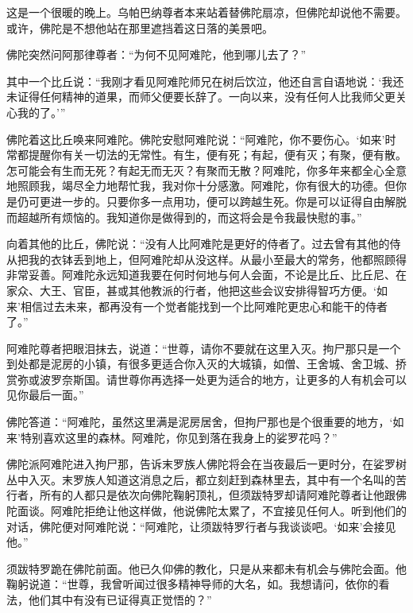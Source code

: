 \documentclass[12pt,twoside,openany]{book}
\begin{document}
这是一个很暖的晚上。乌帕巴纳尊者本来站着替佛陀扇凉，但佛陀却说他不需要。或许，佛陀是不想他站在那里遮挡着这日落的美景吧。

佛陀突然问阿那律尊者：“为何不见阿难陀，他到哪儿去了？”

其中一个比丘说：“我刚才看见阿难陀师兄在树后饮泣，他还自言自语地说：‘我还未证得任何精神的道果，而师父便要长辞了。一向以来，没有任何人比我师父更关心我的了。’”

佛陀着这比丘唤来阿难陀。佛陀安慰阿难陀说：“阿难陀，你不要伤心。‘如来’时常都提醒你有关一切法的无常性。有生，便有死；有起，便有灭；有聚，便有散。怎可能会有生而无死？有起无而无灭？有聚而无散？阿难陀，你多年来都全心全意地照顾我，竭尽全力地帮忙我，我对你十分感激。阿难陀，你有很大的功德。但你是仍可更进一步的。只要你多一点用功，便可以跨越生死。你是可以证得自由解脱而超越所有烦恼的。我知道你是做得到的，而这将会是令我最快慰的事。”

向着其他的比丘，佛陀说：“没有人比阿难陀是更好的侍者了。过去曾有其他的侍从把我的衣钵丢到地上，但阿难陀却从没这样。从最小至最大的常务，他都照顾得非常妥善。阿难陀永远知道我要在何时何地与何人会面，不论是比丘、比丘尼、在家众、大王、官臣，甚或其他教派的行者，他把这些会议安排得智巧方便。‘如来’相信过去未来，都再没有一个觉者能找到一个比阿难陀更忠心和能干的侍者了。”

阿难陀尊者把眼泪抹去，说道：“世尊，请你不要就在这里入灭。拘尸那只是一个到处都是泥房的小镇，有很多更适合你入灭的大城镇，如僧、王舍城、舍卫城、挢赏弥或波罗奈斯国。请世尊你再选择一处更为适合的地方，让更多的人有机会可以见你最后一面。”

佛陀答道：“阿难陀，虽然这里满是泥房居舍，但拘尸那也是个很重要的地方，‘如来’特别喜欢这里的森林。阿难陀，你见到落在我身上的娑罗花吗？”

佛陀派阿难陀进入拘尸那，告诉末罗族人佛陀将会在当夜最后一更时分，在娑罗树丛中入灭。末罗族人知道这消息之后，都立刻赶到森林里去，其中有一个名叫的苦行者，所有的人都只是依次向佛陀鞠躬顶礼，但须跋特罗却请阿难陀尊者让他跟佛陀面谈。阿难陀拒绝让他这样做，他说佛陀太累了，不宜接见任何人。听到他们的对话，佛陀便对阿难陀说：“阿难陀，让须跋特罗行者与我谈谈吧。‘如来’会接见他。”

须跋特罗跪在佛陀前面。他已久仰佛的教化，只是从来都未有机会与佛陀会面。他鞠躬说道：“世尊，我曾听闻过很多精神导师的大名，如。我想请问，依你的看法，他们其中有没有已证得真正觉悟的？”
\end{document}
